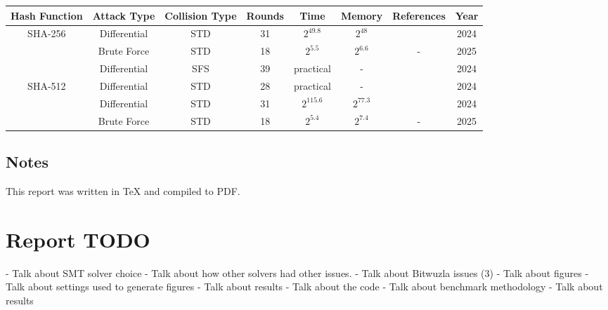 \documentclass[a4paper]{report}
\begin{document}
\begin{center}
\begin{tabular}{c c c c c c c c}
    Hash Function & Attack Type & Collision Type & Rounds & Time & Memory & References & Year \\
    \hline \hline
    \multirow{3}{*}{SHA-256}
                  & Differential & STD & 31 & $2^{49.8}$ & $2^{48}$ & \cite{y_et_al_2024} & 2024 \\
                  & Brute Force & STD & 18 & $2^{5.5}$ & $2^{6.6}$ & - & 2025 \\
                  & Differential & SFS & 39 & practical & - & \cite{y_et_al_2024} & 2024 \\
    \hline
    \multirow{3}{*}{SHA-512}
        & Differential & STD & 28 & practical & - & \cite{y_et_al_2024} & 2024 \\
        & Differential & STD & 31 & $2^{115.6}$ & $2^{77.3}$ & \cite{y_et_al_2024} & 2024 \\
        & Brute Force & STD & 18 & $2^{5.4}$ & $2^{7.4}$ & - & 2025 \\
\end{tabular}
\end{center}


\printglossaries






\begin{appendices}
\section{Notes}
This report was written in TeX and compiled to PDF.
\end{appendices}

\section{Report TODO}
- Talk about SMT solver choice
- Talk about how other solvers had other issues.
- Talk about Bitwuzla issues (3)
- Talk about figures
- Talk about settings used to generate figures
- Talk about results
- Talk about the code
- Talk about benchmark methodology
- Talk about results
\end{document}

